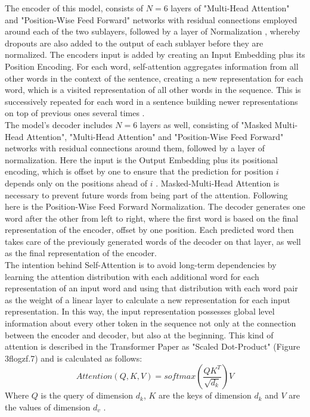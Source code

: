 \documentclass[a4paper, 11pt,titlepage,oneside,openany]{book}
\begin{document}
\indent The encoder of this model, consists of $N=6$ layers of "Multi-Head Attention" and "Position-Wise Feed Forward" networks with residual connections \cite{residualcon} employed around each of the two sublayers, followed by a layer of Normalization \cite{normalization}, whereby dropouts \cite{dopout} are also added to the output of each sublayer before they are normalized. The encoders input is added by creating an Input Embedding plus its Position Encoding. For each word, self-attention aggregates information from all other words in the context of the sentence, creating a new representation for each word, which is a visited representation of all other words in the sequence. This is successively repeated for each word in a sentence  building newer representations on top of previous ones several times \cite{attention}.\\
\indent The model's decoder includes $N=6$ layers as well, consisting of "Masked Multi-Head Attention", "Multi-Head Attention" and "Position-Wise Feed Forward" networks with residual connections around them, followed by a layer of normalization. Here the input is the Output Embedding plus its positional encoding, which is offset by one to ensure that the prediction for position $i$ depends only on the positions ahead of $i$ \cite{attention}.
\newpage Masked-Multi-Head Attention is necessary to prevent future words from being part of the attention. Following here is the Position-Wise Feed Forward Normalization. The decoder generates one word after the other from left to right, where the first word is based on the final representation of the encoder, offset by one position. Each predicted word then takes care of the previously generated words of the decoder on that layer, as well as the final representation of the encoder.\\
\indent The intention behind Self-Attention is to avoid long-term dependencies by learning the attention distribution with each additional word for each representation of an input word and using that distribution with each word pair as the weight of a linear layer to calculate a new representation for each input representation. In this way, the input representation possesses global level information about every other token in the sequence not only at the connection between the encoder and decoder, but also at the beginning. This kind of attention is described in the Transformer Paper as "Scaled Dot-Product" (Figure 3flogzf.7) and is calculated as follows:
\[
Attention(Q,K,V)=softmax(\frac{QK^T}{\sqrt{d_k}})V
\]
Where $Q$ is the query of  dimension $d_k$, $K$ are the keys of dimension $d_k$ and $V$ are the values of dimension $d_v$ \cite{attention}. \\
\end{document}
